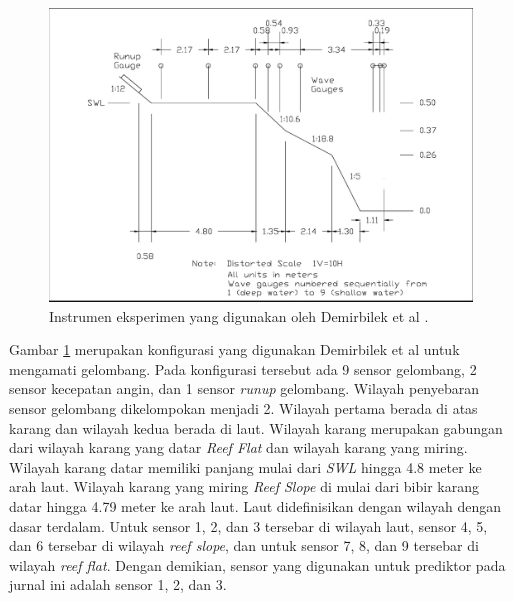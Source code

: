 \begin{figure}[htbp!]
  \begin{center}
    \includegraphics[scale=0.15]{./images/instrumen_eksperimen.png}
  \end{center}
  \caption{Instrumen eksperimen yang digunakan oleh Demirbilek et al \cite{DemirbilekReport}.}
  \label{fig:intrumen_demirbilek}
\end{figure}

Gambar \ref{fig:intrumen_demirbilek} merupakan konfigurasi yang digunakan Demirbilek et al \cite{DemirbilekReport} untuk mengamati gelombang. Pada konfigurasi tersebut ada 9 sensor gelombang, 2 sensor kecepatan angin, dan 1 sensor \emph{runup} gelombang. Wilayah penyebaran sensor gelombang dikelompokan menjadi 2. Wilayah pertama berada di atas karang dan wilayah kedua berada di laut. Wilayah karang merupakan gabungan dari wilayah karang yang datar \emph{Reef Flat} dan wilayah karang yang miring. Wilayah karang datar memiliki panjang mulai dari \emph{SWL} hingga 4.8 meter ke arah laut. Wilayah karang yang miring \emph{Reef Slope} di mulai dari bibir karang datar hingga 4.79 meter ke arah laut. Laut didefinisikan dengan wilayah dengan dasar terdalam. Untuk sensor 1, 2, dan 3 tersebar di wilayah laut, sensor 4, 5, dan 6 tersebar di wilayah \emph{reef slope}, dan untuk sensor 7, 8, dan 9 tersebar di wilayah \emph{reef flat}. Dengan demikian, sensor yang digunakan untuk prediktor pada jurnal ini adalah sensor 1, 2, dan 3.

